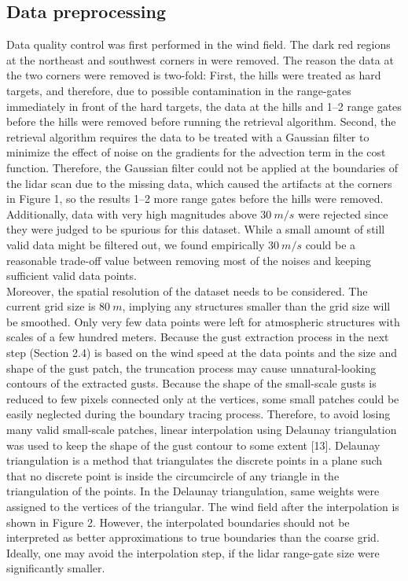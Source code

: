 \subsection{Data preprocessing}
Data quality control was first performed in the wind field. The dark red regions at the northeast and southwest corners in  were removed. The reason the data at the two corners were removed is two-fold: First, the hills were treated as hard targets, and therefore, due to possible contamination in the range-gates immediately in front of the hard targets, the data at the hills and 1–2 range gates before the hills were removed before running the retrieval algorithm. Second, the retrieval algorithm requires the data to be treated with a Gaussian filter to minimize the effect of noise on the gradients for the advection term in the cost function. Therefore, the Gaussian filter could not be applied at the boundaries of the lidar scan due to the missing data, which caused the artifacts at the corners in Figure 1, so the results 1–2 more range gates before the hills were removed.\\
Additionally, data with very high magnitudes above $30~ m/s$ were rejected since they were judged to be spurious for this dataset. While a small amount of still valid data might be filtered out, we found empirically $30~ m/s$ could be a reasonable trade-off value between removing most of the noises and keeping sufficient valid data points.\\
Moreover, the spatial resolution of the dataset needs to be considered. The current grid size is $80~m$, implying any structures smaller than the grid size will be smoothed. Only very few data points were left for atmospheric structures with scales of a few hundred meters. Because the gust extraction process in the next step (Section 2.4) is based on the wind speed at the data points and the size and shape of the gust patch, the truncation process may cause unnatural-looking contours of the extracted gusts. Because the shape of the small-scale gusts is reduced to few pixels connected only at the vertices, some small patches could be easily neglected during the boundary tracing process. Therefore, to avoid losing many valid small-scale patches, linear interpolation using Delaunay triangulation was used to keep the shape of the gust contour to some extent \todo{[13]}[13]. Delaunay triangulation is a method that triangulates the discrete points in a plane such that no discrete point is inside the circumcircle of any triangle in the triangulation of the points. In the Delaunay triangulation, same weights were assigned to the vertices of the triangular. The wind field after the interpolation is shown in Figure 2. However, the interpolated boundaries should not be interpreted as better approximations to true boundaries than the coarse grid. Ideally, one may avoid the interpolation step, if the lidar range-gate size were significantly smaller.
